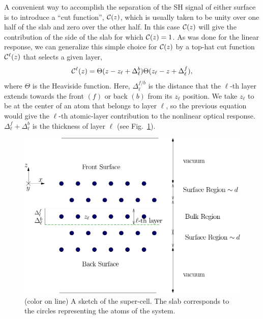 \documentclass[floatfix,prb,aps,superscriptaddress,showpacs,11pt,preprint,letterpaper]{revtex4}
\begin{document}
A convenient way to accomplish the separation of the SH signal of
either surface is to introduce a ``cut function'', ${\mathbf{\cal C}}(z)$, which is 
usually taken to be unity over one half of the slab and zero over 
the other half.\cite{reiningPRB94}
In this case ${\mathbf{\cal C}}(z)$ will give the contribution of the 
side of the slab for which ${\mathbf{\cal C}}(z)=1$. 
As was done for the linear response,\cite{mendozaPRB06}
we can generalize this 
simple choice for ${\mathbf{\cal C}}(z)$ by a top-hat cut function
${\mathbf{\cal C}}^\ell(z)$ that selects a given layer,
\begin{equation}
\label{sz}
{\mathbf{\cal C}}^\ell(z)=\Theta(z-z_\ell+\Delta_\ell^{b})  
            \Theta(z_\ell-z+\Delta_\ell^f),
\end{equation} 
where $\Theta$ is the Heaviside function. Here, $\Delta_\ell^{f/b}$
is the distance that the $\ell$-th layer extends towards the front
$(f)$ or back $(b)$ from its $z_\ell$ position. 
We take $z_\ell$ to be at the center of an atom that 
belongs to layer $\ell$, so the previous
equation would give the $\ell$-th atomic-layer 
contribution to the nonlinear optical response.
$\Delta_\ell^f+\Delta_\ell^b$ is the thickness of layer $\ell$ 
(see Fig.~\ref{fslab}).
\begin{figure}
\centering
\includegraphics[scale=.7]{images/slab}
\caption{(color on line) A sketch of the super-cell. 
The slab corresponds to the
circles representing the atoms of the system.\label{fslab}} 
\end{figure}
\end{document}
